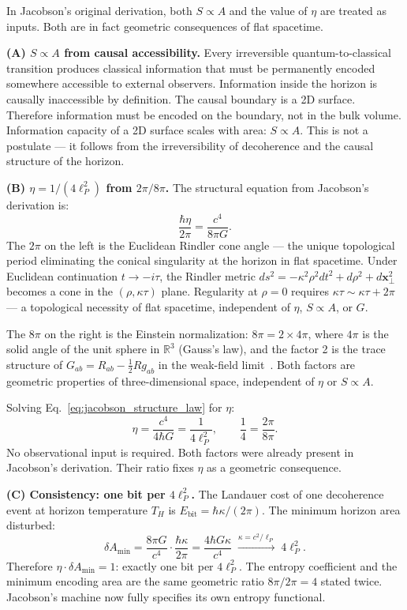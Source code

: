 \documentclass[12pt,a4paper]{article}
\begin{document}
In Jacobson's original derivation, both $S \propto A$ and the value of
$\eta$ are treated as inputs. Both are in fact geometric consequences of
flat spacetime.

\textbf{(A) $S \propto A$ from causal accessibility.}
Every irreversible quantum-to-classical transition produces classical
information that must be permanently encoded somewhere accessible to
external observers. Information inside the horizon is causally
inaccessible by definition. The causal boundary is a 2D surface. Therefore
information must be encoded on the boundary, not in the bulk volume.
Information capacity of a 2D surface scales with area: $S \propto A$.
This is not a postulate --- it follows from the irreversibility of
decoherence and the causal structure of the horizon.

\textbf{(B) $\eta = 1/(4\ell_P^2)$ from $2\pi/8\pi$.}
The structural equation from Jacobson's derivation is:
\begin{equation}
\frac{\hbar\eta}{2\pi} = \frac{c^4}{8\pi G}.
\label{eq:jacobson_structure_law}
\end{equation}
The $2\pi$ on the left is the Euclidean Rindler cone angle --- the unique
topological period eliminating the conical singularity at the horizon in flat
spacetime. Under Euclidean continuation $t\to -i\tau$, the Rindler metric
$ds^2 = -\kappa^2\rho^2 dt^2 + d\rho^2 + d\mathbf{x}_\perp^2$ becomes a
cone in the $(\rho, \kappa\tau)$ plane. Regularity at $\rho = 0$ requires
$\kappa\tau \sim \kappa\tau + 2\pi$ --- a topological necessity of flat
spacetime, independent of $\eta$, $S \propto A$, or $G$.

The $8\pi$ on the right is the Einstein normalization: $8\pi = 2 \times 4\pi$,
where $4\pi$ is the solid angle of the unit sphere in $\mathbb{R}^3$ (Gauss's
law), and the factor 2 is the trace structure of $G_{ab} = R_{ab} -
\frac{1}{2}Rg_{ab}$ in the weak-field limit~\citep{Wald1984}. Both factors
are geometric properties of three-dimensional space, independent of $\eta$
or $S \propto A$.

Solving Eq.~\eqref{eq:jacobson_structure_law} for $\eta$:
\begin{equation}
\boxed{\eta = \frac{c^4}{4\hbar G} = \frac{1}{4\ell_P^2},
\qquad \frac{1}{4} = \frac{2\pi}{8\pi}.}
\label{eq:eta_law}
\end{equation}
No observational input is required. Both factors were already present in
Jacobson's derivation. Their ratio fixes $\eta$ as a geometric consequence.

\textbf{(C) Consistency: one bit per $4\ell_P^2$.}
The Landauer cost of one decoherence event at horizon temperature $T_H$ is
$E_\mathrm{bit} = \hbar\kappa/(2\pi)$. The minimum horizon area disturbed:
\begin{equation}
\delta A_\mathrm{min} = \frac{8\pi G}{c^4}\cdot\frac{\hbar\kappa}{2\pi}
= \frac{4\hbar G\kappa}{c^4}
\;\xrightarrow{\kappa = c^2/\ell_P}\;
4\ell_P^2.
\end{equation}
Therefore $\eta \cdot \delta A_\mathrm{min} = 1$: exactly one bit per
$4\ell_P^2$. The entropy coefficient and the minimum encoding area are
the same geometric ratio $8\pi/2\pi = 4$ stated twice. Jacobson's machine
now fully specifies its own entropy functional.
\end{document}
